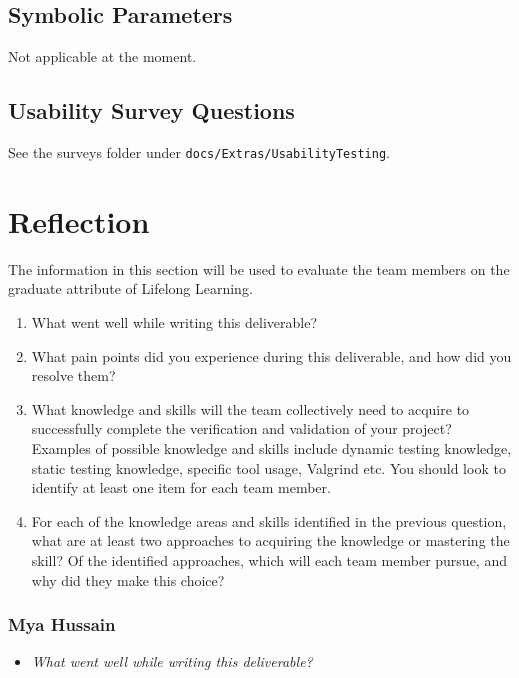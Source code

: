 \documentclass[12pt, titlepage]{article}
\begin{document}
\begin{enumerate}[label={\bf \textcolor{Maroon}{test-SRT-\arabic*}}, wide=0pt, font=\itshape]
\begin{appendices}

\subsection{Symbolic Parameters}

Not applicable at the moment.

\subsection{Usability Survey Questions} \label{A.2}

See the surveys folder under \texttt{docs/Extras/UsabilityTesting}.

\newpage{}
\section{Reflection}


The information in this section will be used to evaluate the team members on the
graduate attribute of Lifelong Learning.



\begin{enumerate}
  \item What went well while writing this deliverable? 
  \item What pain points did you experience during this deliverable, and how
    did you resolve them?
  \item What knowledge and skills will the team collectively need to acquire to
  successfully complete the verification and validation of your project?
  Examples of possible knowledge and skills include dynamic testing knowledge,
  static testing knowledge, specific tool usage, Valgrind etc.  You should look to
  identify at least one item for each team member.
  \item For each of the knowledge areas and skills identified in the previous
  question, what are at least two approaches to acquiring the knowledge or
  mastering the skill?  Of the identified approaches, which will each team
  member pursue, and why did they make this choice?
\end{enumerate}

\subsubsection*{Mya Hussain}
\begin{itemize}
  \item \textit{What went well while writing this deliverable?} \\ 
  

\end{itemize}
\end{appendices}
\end{enumerate}
\end{document}
